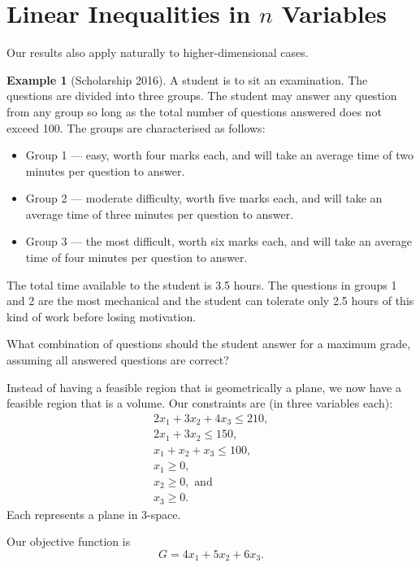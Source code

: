 \documentclass[a4paper,leqno]{article}
\numberwithin{equation}{section}
\theoremstyle{definition}
\newtheorem{ex}[equation]{Example}
\theoremstyle{remark}
\begin{document}
\section{Linear Inequalities in $ n $ Variables}
Our results also apply naturally to higher-dimensional cases.
\begin{ex}[Scholarship 2016]
  A student is to sit an examination. The questions are divided into three groups. The student may
  answer any question from any group so long as the total number of questions answered does not
  exceed 100. The groups are characterised as follows:
  \begin{itemize}
    \item Group 1 --- easy, worth four marks each, and will take an average time of two minutes per
          question to answer.
    \item Group 2 --- moderate difficulty, worth five marks each, and will take an average time of three
          minutes per question to answer.
    \item Group 3 --- the most difficult, worth six marks each, and will take an average time of four
          minutes per question to answer.
  \end{itemize}
  The total time available to the student is 3.5 hours. The questions in groups 1 and 2 are the most mechanical
  and the student can tolerate only 2.5 hours of this kind of work before losing motivation.

  What combination of questions should the student answer for a maximum grade, assuming all answered questions are correct?
\end{ex}

Instead of having a feasible region that is geometrically a plane, we now have a feasible region that is a volume. Our constraints
are (in three variables each):
\begin{gather}
  2x_1 + 3x_2 + 4x_3 \leq 210, \tag{L1} \\
  2x_1 + 3x_2 \leq 150, \tag{L2} \\
  x_1 + x_2 + x_3 \leq 100, \tag{L3} \\
  x_1 \geq 0, \tag{L4} \\
  x_2 \geq 0, \text{ and} \tag{L5}\\
  x_3 \geq 0. \tag{L6}
\end{gather}
Each represents a plane in 3-space.

Our objective function is
\begin{equation}
  G = 4x_1 + 5x_2 + 6x_3.
\end{equation}
\end{document}
